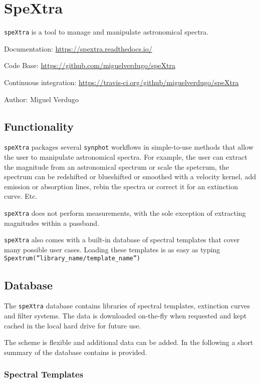 

\section{SpeXtra%
  \label{spextra}%
}

\texttt{speXtra} is a tool to manage and manipulate astronomical spectra. 

Documentation: \url{https://spextra.readthedocs.io/}

Code Base: \url{https://github.com/miguelverdugo/speXtra}

Continuous integration: \url{https://travis-ci.org/github/miguelverdugo/speXtra}

Author: Miguel Verdugo


\subsection{Functionality%
  \label{functionality}%
}

\texttt{speXtra} packages several \texttt{synphot} workflows in simple-to-use methods that allow the user 
to manipulate astronomical spectra. For example, the user
can extract the magnitude from an astronomical spectrum or 
scale the spetcrum, the spectrum can be redshifted or 
blueshifted or smoothed with a velocity kernel, add emission or absorption lines, rebin the spectra or correct it for an extinction curve. Etc.

\texttt{speXtra} does not perform measurements, with the sole exception of extracting magnitudes within a passband. 

\texttt{speXtra} also comes with a built-in database of spectral templates  that cover many possible user cases. Loading these templates is as easy as typing \texttt{Spextrum(''library\_name/template\_name'')}
 

\subsection{Database}

The \texttt{speXtra} database contains libraries 
of spectral templates, extinction curves and filter
systems. The data is downloaded on-the-fly when
requested and kept cached in the local hard drive 
for future use. 

The scheme is flexible and additional data can be added. In
the following a short summary of the database contains is provided.

\subsubsection{Spectral Templates}

